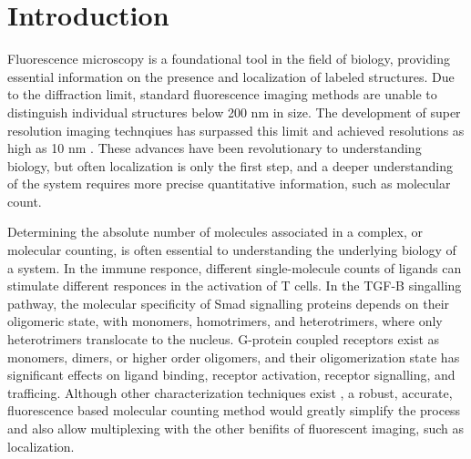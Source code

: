 \section{Introduction}


Fluorescence microscopy is a foundational tool in the field of biology,
  providing essential information on the presence and localization 
  of labeled structures.
  Due to the diffraction limit, standard fluorescence imaging methods are unable to distinguish 
  individual structures below 200 nm in size.
  The development of super resolution imaging technqiues \cite{betzig_2006, rust_2006} has surpassed 
  this limit and achieved resolutions as high as 10 nm \cite{valli_seeing_2021}.
  These advances have been revolutionary to understanding biology, 
  but often localization is only the first step,
  and a deeper understanding of the system requires more precise
  quantitative information, such as molecular count. 

Determining the absolute number of molecules associated in a complex, or molecular counting, is often essential to understanding the
  underlying biology of a system. 
  In the immune responce, different single-molecule counts of ligands can stimulate different responces in the activation of T cells.
  \cite{irvine_2002}
  In the TGF-B singalling pathway, the molecular specificity of Smad signalling proteins depends on their oligomeric state,
  with monomers, homotrimers, and heterotrimers, where only heterotrimers translocate to the nucleus. 
  \cite{moustakas_2002, inman_2002} 
  G-protein coupled receptors exist as monomers, dimers, or higher order oligomers, and their oligomerization state has significant effects
  on ligand binding, receptor activation, receptor signalling, and trafficing.
  \cite{felce_2018, breitwieser_2004}
  Although other characterization techniques exist , a robust, accurate, fluorescence based molecular counting 
  method would greatly simplify the process and also allow multiplexing with the other benifits of fluorescent imaging, such as localization.


